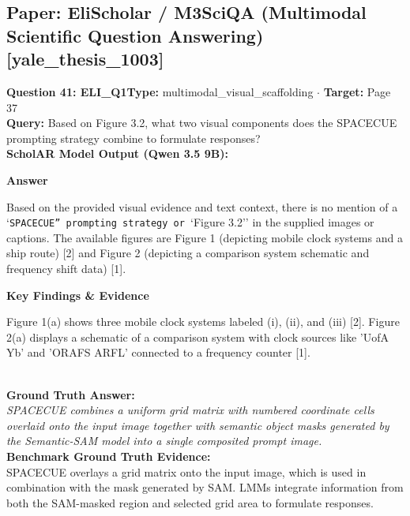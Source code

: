 \documentclass[10pt,a4paper]{article}
\begin{document}
\subsection{Paper: EliScholar / M3SciQA (Multimodal Scientific Question Answering) [yale\_thesis\_1003]}
\vspace{-4pt}
\begin{tcolorbox}[questionbox]
{\noindent\bfseries\large\color{navy} Question 41: ELI\_Q1}\hfill {\footnotesize\color{darkteal}\textbf{Type:} multimodal\_visual\_scaffolding $\cdot$ \textbf{Target:} Page 37}\\[4pt]
{\noindent\bfseries\color{accentblue} Query: } Based on Figure 3.2, what two visual components does the SPACECUE prompting strategy combine to formulate responses?\\[6pt]
{\noindent\bfseries\color{navy} ScholAR Model Output (Qwen 3.5 9B):}\\[2pt]
{\small \noindent \textbf{Answer}\par\vspace{3pt}Based on the provided visual evidence and text context, there is no mention of a `\texttt{SPACECUE'' prompting strategy or }`Figure 3.2'' in the supplied images or captions. The available figures are Figure 1 (depicting mobile clock systems and a ship route) [2] and Figure 2 (depicting a comparison system schematic and frequency shift data) [1].\par\vspace{3pt}\noindent \textbf{Key Findings \& Evidence}\par\vspace{3pt}Figure 1(a) shows three mobile clock systems labeled (i), (ii), and (iii) [2]. Figure 2(a) displays a schematic of a comparison system with clock sources like 'UofA Yb' and 'ORAFS ARFL' connected to a frequency counter [1].}\\[6pt]
{\noindent\bfseries\color{darkteal} Ground Truth Answer:}\\[2pt]
{\small\itshape SPACECUE combines a uniform grid matrix with numbered coordinate cells overlaid onto the input image together with semantic object masks generated by the Semantic-SAM model into a single composited prompt image.}\\[4pt]
{\noindent\bfseries\color{darkteal} Benchmark Ground Truth Evidence:}\\[2pt]
{\footnotesize SPACECUE overlays a grid matrix onto the input image, which is used in combination with the mask generated by SAM. LMMs integrate information from both the SAM-masked region and selected grid area to formulate responses.}\\[4pt]

\end{tcolorbox}
\end{document}
